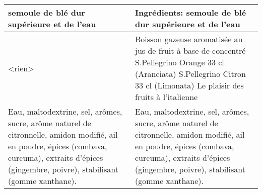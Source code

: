 \begin{longtable}{p{7cm}p{7cm}}
                                                                                                                                                                                                                                                              semoule de blé dur supérieure et de l'eau &                                                                                                                                                                                                                                                                                                                                                                                                                 Ingrédients: semoule de blé dur supérieure et de l'eau  \\ \hline
                                                                                                                                                                                                                                                                                                 <rien> &                                                                                                                                                                                                                                                                                        Boisson gazeuse aromatisée au jus de fruit à base de concentré \newline S.Pellegrino Orange 33 cl (Aranciata) \newline S.Pellegrino Citron 33 cl (Limonata) \newline Le plaisir des fruits à l’italienne \\ \hline
                                                                                                   Eau, maltodextrine, sel, arômes, sucre, arôme naturel de citronnelle, amidon modifié, ail en poudre, épices (combava, curcuma), extraits d'épices (gingembre, poivre), stabilisant (gomme xanthane). &                                                                                                                                                                                                                                                               Eau, maltodextrine, sel, arômes, sucre, arôme naturel de citronnelle, amidon modifié, ail en poudre, épices (combava, curcuma), extraits  \newline d'épices (gingembre, poivre), stabilisant (gomme xanthane).    \\ \hline

\end{longtable}
